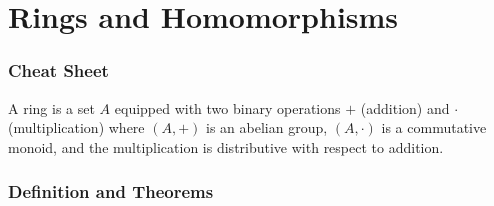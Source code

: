 \chapter{Rings and Homomorphisms}
\subsection*{Cheat Sheet}
\begin{defbox}
    \begin{definition}
        A {\color{maththen}ring} is a {\color{mathobj}set} \(A\) equipped with two {\color{mathobj}binary operations} \(+\) ({\color{mathrem}addition}) and \(\cdot\) ({\color{mathrem}multiplication}) where \((A, +)\) is an abelian group, \((A, \cdot)\) is a commutative monoid, and the multiplication is distributive with respect to addition.
    \end{definition}
\end{defbox}

\newpage
\subsection*{Definition and Theorems}

